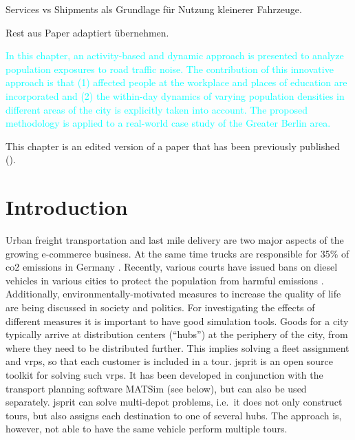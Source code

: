 

Services vs Shipments als Grundlage für Nutzung kleinerer Fahrzeuge.

Rest aus Paper adaptiert übernehmen.

\label{el-shipments-...:sec}

\textcolor{cyan}{In this chapter, an activity-based and dynamic approach is presented to analyze population
exposures to road traffic noise. The contribution of this innovative approach is that (1) affected
people at the workplace and places of education are incorporated and (2) the within-day dynamics
of varying population densities in different areas of the city is explicitly taken into account. The
proposed methodology is applied to a real-world case study of the Greater Berlin area.} 

This chapter is an edited version of a paper that has been previously published (\citet{MartinsTurnerNagel2019FreightMultipleToursABMTrans}).

\section{Introduction}
\label{sec:el-shipments-intro}
Urban freight transportation and last mile delivery are two major aspects of the growing e-commerce business. At the same time trucks are responsible for 35\% of \gls{co2}  emissions in Germany \citep{BMU2018KlimaschutzZahlen}. Recently, various courts have issued bans on diesel vehicles in various cities to protect the population from harmful emissions \citep{wikiDieselfahrverbot}. Additionally, environmentally-motivated measures to increase the quality of life are being discussed in society and politics\citep{SenStadt2013Luftreinhalteplan}. For investigating the effects of different measures it is important to have good simulation tools.  
Goods for a city typically arrive at distribution centers (``hubs'') at the periphery of the city, from where they need to be distributed further.  This implies solving a fleet assignment and \glspl{vrp}, so that each customer is included in a tour.  \Gls{jsprit} is an open source toolkit for solving such \glspl{vrp}.  It has been developed in conjunction with the transport planning software \acrshort{MATSim} (see below), but can also be used separately. \Gls{jsprit} can solve multi-depot problems, i.e.\ it does not only construct tours, but also assigns each destination to one of several hubs.  The approach is, however, not able to have the same vehicle perform multiple tours.  

